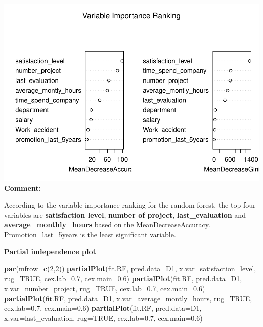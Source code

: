 \documentclass[
  11pt,
]{article}
\newenvironment{Shaded}{\begin{snugshade}}{\end{snugshade}}
\newcommand{\AttributeTok}[1]{\textcolor[rgb]{0.13,0.29,0.53}{#1}}
\newcommand{\ConstantTok}[1]{\textcolor[rgb]{0.56,0.35,0.01}{#1}}
\newcommand{\DecValTok}[1]{\textcolor[rgb]{0.00,0.00,0.81}{#1}}
\newcommand{\FloatTok}[1]{\textcolor[rgb]{0.00,0.00,0.81}{#1}}
\newcommand{\FunctionTok}[1]{\textcolor[rgb]{0.13,0.29,0.53}{\textbf{#1}}}
\newcommand{\NormalTok}[1]{#1}
\begin{document}
\includegraphics[width=0.9\linewidth]{OWUSU_project_files/figure-latex/unnamed-chunk-27-1}\\
\textbf{Comment:}

According to the variable importance ranking for the random forest, the
top four variables are \textbf{satisfaction level}, \textbf{number of
project}, \textbf{last\_evaluation} and \textbf{average\_monthly\_hours}
based on the MeanDecreaseAccuracy. Promotion\_last\_5years is the least
significant variable.

\hfill\break
\textbf{Partial independence plot}

\begin{Shaded}
\begin{Highlighting}[]
\FunctionTok{par}\NormalTok{(}\AttributeTok{mfrow=}\FunctionTok{c}\NormalTok{(}\DecValTok{2}\NormalTok{,}\DecValTok{2}\NormalTok{))}
\FunctionTok{partialPlot}\NormalTok{(fit.RF, }\AttributeTok{pred.data=}\NormalTok{D1, }\AttributeTok{x.var=}\NormalTok{satisfaction\_level, }
            \AttributeTok{rug=}\ConstantTok{TRUE}\NormalTok{, }\AttributeTok{cex.lab=}\FloatTok{0.7}\NormalTok{, }\AttributeTok{cex.main=}\FloatTok{0.6}\NormalTok{)}
\FunctionTok{partialPlot}\NormalTok{(fit.RF, }\AttributeTok{pred.data=}\NormalTok{D1, }\AttributeTok{x.var=}\NormalTok{number\_project,}
            \AttributeTok{rug=}\ConstantTok{TRUE}\NormalTok{, }\AttributeTok{cex.lab=}\FloatTok{0.7}\NormalTok{, }\AttributeTok{cex.main=}\FloatTok{0.6}\NormalTok{)}
\FunctionTok{partialPlot}\NormalTok{(fit.RF, }\AttributeTok{pred.data=}\NormalTok{D1, }\AttributeTok{x.var=}\NormalTok{average\_montly\_hours,}
            \AttributeTok{rug=}\ConstantTok{TRUE}\NormalTok{, }\AttributeTok{cex.lab=}\FloatTok{0.7}\NormalTok{, }\AttributeTok{cex.main=}\FloatTok{0.6}\NormalTok{)}
\FunctionTok{partialPlot}\NormalTok{(fit.RF, }\AttributeTok{pred.data=}\NormalTok{D1, }\AttributeTok{x.var=}\NormalTok{last\_evaluation, }
            \AttributeTok{rug=}\ConstantTok{TRUE}\NormalTok{, }\AttributeTok{cex.lab=}\FloatTok{0.7}\NormalTok{, }\AttributeTok{cex.main=}\FloatTok{0.6}\NormalTok{)}
\end{Highlighting}
\end{Shaded}
\end{document}
